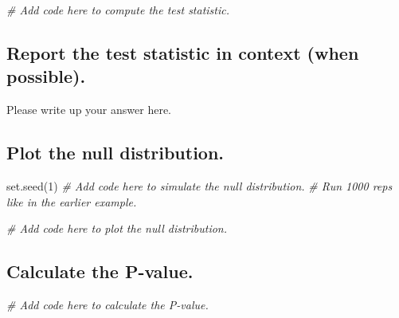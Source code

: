 \documentclass[
]{book}
\newenvironment{Shaded}{\begin{snugshade}}{\end{snugshade}}
\newcommand{\CommentTok}[1]{\textcolor[rgb]{0.56,0.35,0.01}{\textit{#1}}}
\newcommand{\DecValTok}[1]{\textcolor[rgb]{0.00,0.00,0.81}{#1}}
\newcommand{\FunctionTok}[1]{\textcolor[rgb]{0.00,0.00,0.00}{#1}}
\newcommand{\NormalTok}[1]{#1}
\begin{document}
\begin{Shaded}
\begin{Highlighting}[]
\CommentTok{\# Add code here to compute the test statistic.}
\end{Highlighting}
\end{Shaded}

\hypertarget{report-the-test-statistic-in-context-when-possible.-2}{%
\subsection*{Report the test statistic in context (when possible).}\label{report-the-test-statistic-in-context-when-possible.-2}}

Please write up your answer here.

\hypertarget{plot-the-null-distribution.-2}{%
\subsection*{Plot the null distribution.}\label{plot-the-null-distribution.-2}}

\begin{Shaded}
\begin{Highlighting}[]
\FunctionTok{set.seed}\NormalTok{(}\DecValTok{1}\NormalTok{)}
\CommentTok{\# Add code here to simulate the null distribution.}
\CommentTok{\# Run 1000 reps like in the earlier example.}
\end{Highlighting}
\end{Shaded}

\begin{Shaded}
\begin{Highlighting}[]
\CommentTok{\# Add code here to plot the null distribution.}
\end{Highlighting}
\end{Shaded}

\hypertarget{calculate-the-p-value.-2}{%
\subsection*{Calculate the P-value.}\label{calculate-the-p-value.-2}}

\begin{Shaded}
\begin{Highlighting}[]
\CommentTok{\# Add code here to calculate the P{-}value.}
\end{Highlighting}
\end{Shaded}
\end{document}

